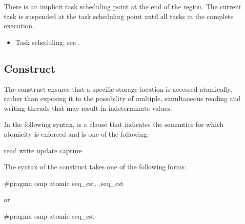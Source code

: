 There is an implicit task scheduling point at the end of the  
region. The current task is suspended at the task scheduling point until all 
tasks in the  complete execution.

\crossreferences
\begin{itemize}
\item Task scheduling, see 
.
\end{itemize}










\subsection{ Construct}
\label{subsec:atomic Construct}
\summary
The  construct ensures that a specific storage location is accessed atomically, 
rather than exposing it to the possibility of multiple, simultaneous reading and writing 
threads that may result in indeterminate values.

\syntax
In the following syntax,  is a clause that indicates
the semantics for which atomicity is enforced and is one of the following:

\begin{indentedcodelist}
read
write
update
capture
\end{indentedcodelist}

\ccppspecificstart
The syntax of the  construct takes one of the following forms:

\begin{boxedcode}
\#pragma omp atomic \plc{[}seq\_cst\plc{[},\plc{]]}  \plc{[[},\plc{]}seq\_cst\plc{]} 
\end{boxedcode}


or

\begin{boxedcode}
\#pragma omp atomic \plc{[}seq\_cst\plc{]}  
\end{boxedcode}

